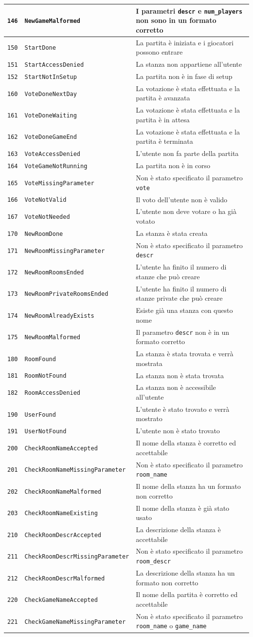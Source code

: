 \documentclass[10pt,a4paper]{article}
\newcommand{\apicode}[3]{
\texttt{#1} & \texttt{#2} & #3 \\
}
\begin{document}
{\begin{tabular}{|rl|l|}
\apicode{146}{NewGameMalformed}{I parametri \texttt{descr} e \texttt{num\_players} non sono in un formato corretto}
\hline
\apicode{150}{StartDone}{La partita è iniziata e i giocatori possono entrare}
\apicode{151}{StartAccessDenied}{La stanza non appartiene all'utente}
\apicode{152}{StartNotInSetup}{La partita non è in fase di setup}
\hline
\apicode{160}{VoteDoneNextDay}{La votazione è stata effettuata e la partita è avanzata}
\apicode{161}{VoteDoneWaiting}{La votazione è stata effettuata e la partita è in attesa}
\apicode{162}{VoteDoneGameEnd}{La votazione è stata effettuata e la partita è terminata}
\apicode{163}{VoteAccessDenied}{L'utente non fa parte della partita}
\apicode{164}{VoteGameNotRunning}{La partita non è in corso}
\apicode{165}{VoteMissingParameter}{Non è stato specificato il parametro \texttt{vote}}
\apicode{166}{VoteNotValid}{Il voto dell'utente non è valido}
\apicode{167}{VoteNotNeeded}{L'utente non deve votare o ha già votato}
\hline
\apicode{170}{NewRoomDone}{La stanza è stata creata}
\apicode{171}{NewRoomMissingParameter}{Non è stato specificato il parametro \texttt{descr}}
\apicode{172}{NewRoomRoomsEnded}{L'utente ha finito il numero di stanze che può creare}
\apicode{173}{NewRoomPrivateRoomsEnded}{L'utente ha finito il numero di stanze private che può creare}
\apicode{174}{NewRoomAlreadyExists}{Esiste già una stanza con questo nome}
\apicode{175}{NewRoomMalformed}{Il parametro \texttt{descr} non è in un formato corretto}
\hline
\apicode{180}{RoomFound}{La stanza è stata trovata e verrà mostrata}
\apicode{181}{RoomNotFound}{La stanza non è stata trovata}
\apicode{182}{RoomAccessDenied}{La stanza non è accessibile all'utente}
\hline
\apicode{190}{UserFound}{L'utente è stato trovato e verrà mostrato}
\apicode{191}{UserNotFound}{L'utente non è stato trovato}
\hline
\apicode{200}{CheckRoomNameAccepted}{Il nome della stanza è corretto ed accettabile}
\apicode{201}{CheckRoomNameMissingParameter}{Non è stato specificato il parametro \texttt{room\_name}}
\apicode{202}{CheckRoomNameMalformed}{Il nome della stanza ha un formato non corretto}
\apicode{203}{CheckRoomNameExisting}{Il nome della stanza è già stato usato}
\hline
\apicode{210}{CheckRoomDescrAccepted}{La descrizione della stanza è accettabile}
\apicode{211}{CheckRoomDescrMissingParameter}{Non è stato specificato il parametro \texttt{room\_descr}}
\apicode{212}{CheckRoomDescrMalformed}{La descrizione della stanza ha un formato non corretto}
\hline
\apicode{220}{CheckGameNameAccepted}{Il nome della partita è corretto ed accettabile}
\apicode{221}{CheckGameNameMissingParameter}{Non è stato specificato il parametro \texttt{room\_name} o \texttt{game\_name}}

\end{tabular}}
\end{document}
